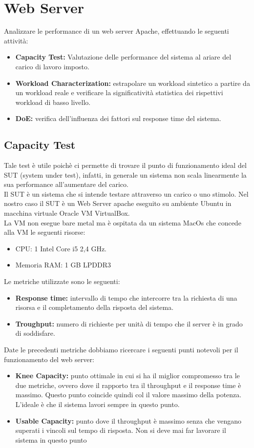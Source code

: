 \chapter{Web Server}
Analizzare le performance di un web server Apache, effettuando le seguenti attività:

\begin{itemize}
    \item \textbf{Capacity Test:} Valutazione delle performance del sistema al ariare del carico di lavoro imposto.
    \item \textbf{Workload Characterization: } estrapolare un workload sintetico a partire da un workload reale e verificare la significatività statistica dei rispettivi workload di basso livello.
    \item \textbf{DoE: } verifica dell'influenza dei fattori sul response time del sistema. 
\end{itemize}
\section{Capacity Test}
Tale test è utile poichè ci permette di trovare il punto di funzionamento ideal del SUT (system under test), infatti, in generale un sistema non scala linearmente la sua performance all'aumentare del carico.\\
Il SUT è un sistema che si intende testare attraverso un carico o uno stimolo.
Nel nostro caso il SUT è un Web Server apache eseguito su ambiente Ubuntu in macchina virtuale Oracle VM VirtualBox.\\
La VM non esegue bare metal ma è ospitata da un sistema MacOs che concede alla VM le seguenti risorse:
\begin{itemize}
    \item CPU: 1 Intel Core i5 2,4 GHz.
    \item Memoria RAM: 1 GB LPDDR3 
\end{itemize}
Le metriche utilizzate sono le seguenti: 
\begin{itemize}
    \item \textbf{Response time: }intervallo di tempo che intercorre tra la richiesta di una risorsa e il completamento della risposta del sistema.
    \item \textbf{Troughput: }numero di richieste per unità di tempo che il server è in grado di soddisfare.
\end{itemize}
Date le precedenti metriche dobbiamo ricercare i seguenti punti notevoli per il funzionamento del web server:
\begin{itemize}
    \item \textbf{Knee Capacity: }punto ottimale in cui si ha il miglior compromesso tra le due metriche, ovvero dove il rapporto tra il throughput e il response time è massimo. Questo punto coincide quindi col il valore massimo della potenza. L'ideale è che il sistema lavori sempre in questo punto.
    \item \textbf{Usable Capacity: }punto dove il throughput è massimo senza che vengano superati i vincoli sul tempo di risposta. Non si deve mai far lavorare il sistema in questo punto
\end{itemize}

